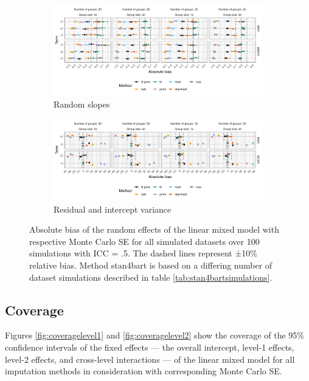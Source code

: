 \documentclass[3p,12pt,a4paper]{elsarticle}
\begin{document}
\begin{figure}[H]
    \centering 
    \begin{subfigure}[b]{1\textwidth}
        \centering
        \includegraphics[width=1\textwidth]{biasrandom.png}
        \caption{Random slopes}
        \label{fig:biasrandom}
    \end{subfigure}
    \begin{subfigure}[b]{1\textwidth}
        \centering
        \includegraphics[width=1\textwidth]{bias2.png}
        \caption{Residual and intercept variance}
        \label{fig:bias2}
    \end{subfigure}
    \caption{Absolute bias of the random effects of the linear mixed model with respective Monte Carlo SE for all simulated datasets over 100 simulations with ICC = .5. The dashed lines represent ±10\% relative bias. Method stan4bart is based on a differing number of dataset simulations described in table \ref{tab:stan4bartsimulations}.}
    \label{fig:biasrandom2}
\end{figure}

\subsection{Coverage}
Figures \ref{fig:coveragelevel1} and \ref{fig:coveragelevel2} show the coverage of the 95\% confidence intervals of the fixed effects --- the overall intercept, level-1 effects, level-2 effects, and cross-level interactions --- of the linear mixed model for all imputation methods in consideration with corresponding Monte Carlo SE.
\end{document}
